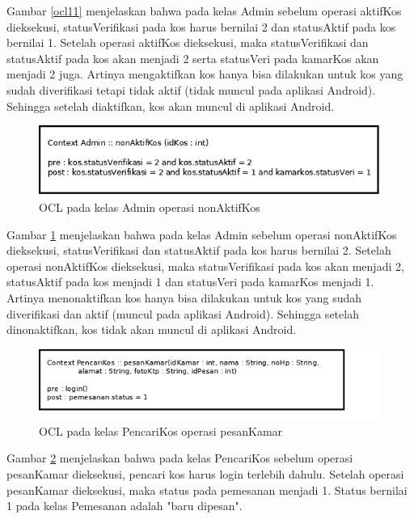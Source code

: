 	Gambar \ref{ocl11} menjelaskan bahwa pada kelas Admin sebelum operasi aktifKos dieksekusi, statusVerifikasi pada kos harus bernilai 2 dan statusAktif pada kos bernilai 1. Setelah operasi aktifKos dieksekusi, maka statusVerifikasi dan statusAktif pada kos akan menjadi 2 serta statusVeri pada kamarKos akan menjadi 2 juga. Artinya mengaktifkan kos hanya bisa dilakukan untuk kos yang sudah diverifikasi tetapi tidak aktif (tidak muncul pada aplikasi Android). Sehingga setelah diaktifkan, kos akan muncul di aplikasi Android.
	
	\begin{figure}[H]
		\centering
		\includegraphics[scale=0.5]{gambar/ocl/nonAktifKos}
		\caption{OCL pada kelas Admin operasi nonAktifKos}
		\label{ocl12}
	\end{figure} 
	
	Gambar \ref{ocl12} menjelaskan bahwa pada kelas Admin sebelum operasi nonAktifKos dieksekusi, statusVerifikasi dan statusAktif pada kos harus bernilai 2. Setelah operasi nonAktifKos dieksekusi, maka statusVerifikasi pada kos akan menjadi 2, statusAktif pada kos menjadi 1 dan statusVeri pada kamarKos menjadi 1. Artinya menonaktifkan kos hanya bisa dilakukan untuk kos yang sudah diverifikasi dan aktif (muncul pada aplikasi Android). Sehingga setelah dinonaktifkan, kos tidak akan muncul di aplikasi Android.

	\begin{figure}[H]
		\centering
		\includegraphics[scale=0.7]{gambar/ocl/pesankamar}
		\caption{OCL pada kelas PencariKos operasi pesanKamar}
		\label{ocl12a}
	\end{figure}

	Gambar \ref{ocl12a} menjelaskan bahwa pada kelas PencariKos sebelum operasi pesanKamar dieksekusi, pencari kos harus login terlebih dahulu. Setelah operasi pesanKamar dieksekusi, maka status pada pemesanan menjadi 1. Status bernilai 1 pada kelas Pemesanan adalah "baru dipesan". 

